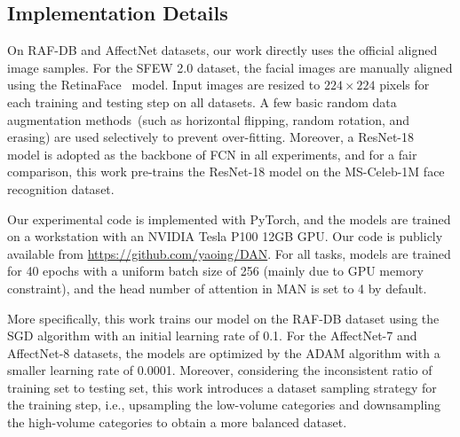 \documentclass{article}
\begin{document}
\subsection{Implementation Details}
On RAF-DB and AffectNet datasets, our work directly uses the official aligned image samples. For the SFEW 2.0 dataset, the facial images are manually aligned using the RetinaFace~\cite{deng2019retinaface} model. Input images are resized to $224\times 224$ pixels for each training and testing step on all datasets. A few basic random data augmentation methods~(such as horizontal flipping, random rotation, and erasing) are used selectively to prevent over-fitting. Moreover, a ResNet-18~\cite{he2016deep} model is adopted as the backbone of FCN in all experiments, and for a fair comparison, this work pre-trains the ResNet-18 model on the MS-Celeb-1M face recognition dataset. 

Our experimental code is implemented with PyTorch, and the models are trained on a workstation with an NVIDIA Tesla P100 12GB GPU. {Our code is publicly available from} \url{https://github.com/yaoing/DAN}. For all tasks, models are trained for 40 epochs with {a uniform batch size of 256 (mainly due to GPU memory constraint)}, and the head number of attention in MAN is set to 4 by default.

More specifically, this work trains our model on the RAF-DB dataset using the SGD algorithm with an initial learning rate of 0.1. For the AffectNet-7 and AffectNet-8 datasets, the models are optimized by the ADAM algorithm with a smaller learning rate of 0.0001. Moreover, considering the inconsistent ratio of training set to testing set, this work introduces a dataset sampling strategy for the training step, i.e., upsampling the low-volume categories and downsampling the high-volume categories to obtain a more balanced dataset. 
\end{document}
